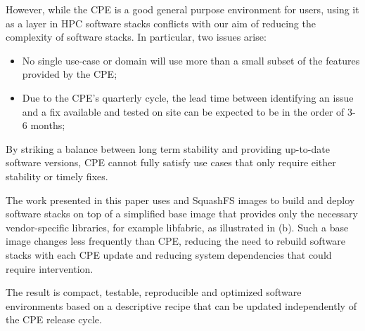 However, while the CPE is a good general purpose environment for users, using it as a layer in HPC software stacks conflicts with our aim of reducing the complexity of software stacks.
In particular, two issues arise:
\begin{itemize}
    \item No single use-case or domain will use more than a small subset of the features provided by the CPE;
    \item Due to the CPE's quarterly cycle, the lead time between identifying an issue and a fix available and tested on site can be expected to be in the order of 3-6 months;
\end{itemize}
By striking a balance between long term stability and providing up-to-date software versions, CPE cannot fully satisfy use cases that only require either stability or timely fixes.

The work presented in this paper uses \spack and SquashFS images to build and deploy software stacks on top of a simplified base image that provides only the necessary vendor-specific libraries, for example libfabric, as illustrated in (b).
Such a base image changes less frequently than CPE, reducing the need to rebuild software stacks with each CPE update and reducing system dependencies that could require intervention.

The result is compact, testable, reproducible and optimized software environments based on a descriptive recipe that can be updated independently of the CPE release cycle.




